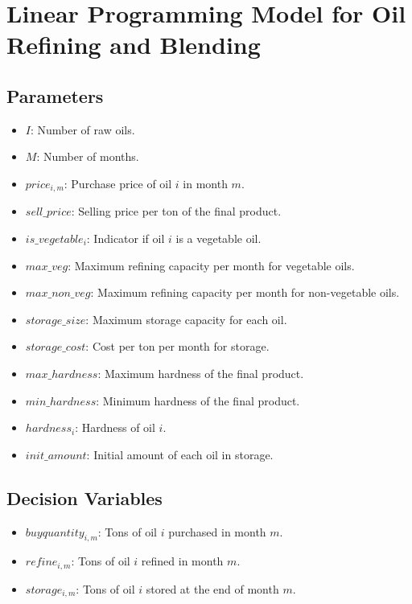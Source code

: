 \documentclass{article}
\begin{document}
\section*{Linear Programming Model for Oil Refining and Blending}

\subsection*{Parameters}
\begin{itemize}
    \item $I$: Number of raw oils.
    \item $M$: Number of months.
    \item $price_{i,m}$: Purchase price of oil $i$ in month $m$.
    \item $sell\_price$: Selling price per ton of the final product.
    \item $is\_vegetable_i$: Indicator if oil $i$ is a vegetable oil.
    \item $max\_veg$: Maximum refining capacity per month for vegetable oils.
    \item $max\_non\_veg$: Maximum refining capacity per month for non-vegetable oils.
    \item $storage\_size$: Maximum storage capacity for each oil.
    \item $storage\_cost$: Cost per ton per month for storage.
    \item $max\_hardness$: Maximum hardness of the final product.
    \item $min\_hardness$: Minimum hardness of the final product.
    \item $hardness_i$: Hardness of oil $i$.
    \item $init\_amount$: Initial amount of each oil in storage.
\end{itemize}

\subsection*{Decision Variables}
\begin{itemize}
    \item $buyquantity_{i,m}$: Tons of oil $i$ purchased in month $m$.
    \item $refine_{i,m}$: Tons of oil $i$ refined in month $m$.
    \item $storage_{i,m}$: Tons of oil $i$ stored at the end of month $m$.
\end{itemize}
\end{document}
